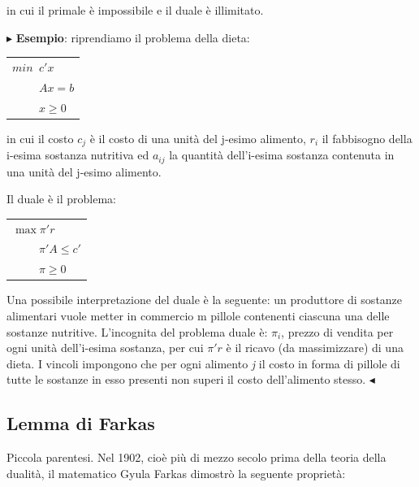 \documentclass[11pt]{book}
\begin{document}
in cui il primale \`e impossibile e il duale \`e illimitato.

\vspace{11pt}
$\blacktriangleright$ {\bf Esempio}: riprendiamo il problema della
dieta:

\vspace{11pt}
\begin{center}
\begin{tabular}{l}
$min\phantom{a}c'x$ \\
$\phantom{mina}Ax= b$ \\
$\phantom{mina}x\geq 0$ \\
\end{tabular}
\end{center}
\vspace{11pt}

in cui il costo $c_j$ \`e il costo di una unit\`a del j-esimo
alimento, $r_i$ il fabbisogno della i-esima sostanza nutritiva ed
$a_{ij}$ la quantit\`a dell'i-esima sostanza contenuta in una unit\`a
del j-esimo alimento. 

Il duale \`e il problema:

\vspace{11pt}
\begin{center}
\begin{tabular}{l}
$\max \pi'r$ \\
$\phantom{mina}\pi'A \leq c'$ \\
$\phantom{mina}\pi \geq 0$ \\
\end{tabular}
\end{center}
\vspace{11pt}

Una possibile interpretazione del duale \`e la seguente: un produttore
di sostanze alimentari vuole metter in commercio m pillole contenenti
ciascuna una delle sostanze nutritive. L'incognita del problema duale
\`e: $\pi_i$, prezzo di vendita per ogni unit\`a dell'i-esima
sostanza, per cui $\pi'r$ \`e il ricavo (da massimizzare) di una
dieta. I vincoli impongono che per ogni alimento {\em j} il costo in
forma di pillole di tutte le sostanze in esso presenti non superi il
costo dell'alimento stesso. $\blacktriangleleft$
\vspace{11pt}

\subsection{Lemma di Farkas}

Piccola parentesi. Nel 1902, cio\`e pi\`u di mezzo secolo prima della
teoria della dualit\`a, il matematico Gyula Farkas dimostr\`o la
seguente propriet\`a:
\end{document}
